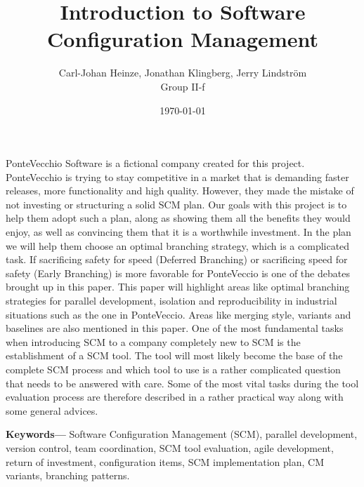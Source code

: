 \documentclass[10pt]{article}
\renewenvironment{abstract}
  {\small\quotation
  {\bfseries\noindent{\large\abstractname}\par\nobreak\smallskip}}
  {\endquotation}
\providecommand{\keywords}[1]{\textbf{{Keywords---}} #1}
\begin{document}
\makeatletter
\renewcommand{\@biblabel}[1]{\quad#1.}
\makeatother


\pagestyle{myheadings}


\begin{titlepage}
\title{Introduction to Software Configuration Management}
\author{Carl-Johan Heinze, Jonathan Klingberg, Jerry Lindström \\Group II-f}
\date{\today}
\maketitle
\thispagestyle{empty}
\end{titlepage}

\tableofcontents
\thispagestyle{empty}
\newpage
{}

\begin{abstract}
\noindent PonteVecchio Software is a fictional company created for this project. PonteVecchio is trying to stay competitive in a market that is demanding faster releases, more functionality and high quality. However, they made the mistake of not investing or structuring a solid SCM plan. Our goals with this project is to help them adopt such a plan, along as showing them all the benefits they would enjoy, as well as convincing them that it is a worthwhile investment.
\noindent In the plan we will help them choose an optimal branching strategy, which is a complicated task. If sacrificing safety for speed (Deferred Branching) or sacrificing speed for safety (Early Branching) is more favorable for PonteVeccio is one of the debates brought up in this paper. This paper will highlight areas like optimal branching strategies for parallel development, isolation and reproducibility in industrial situations such as the one in PonteVeccio. Areas like merging style, variants and baselines are also mentioned in this paper.
\noindent One of the most fundamental tasks when introducing SCM to a company completely new to SCM is the establishment of a SCM tool. The tool will most likely become the base of the complete SCM process and which tool to use is a rather complicated question that needs to be answered with care. Some of the most vital tasks during the tool evaluation process are therefore described in a rather practical way along with some general advices.


\end{abstract}
\keywords{Software Configuration Management (SCM), parallel development, version control, team coordination, SCM tool evaluation, agile development, return of investment, configuration items, SCM implementation plan, CM variants, branching patterns.}
\end{document}
